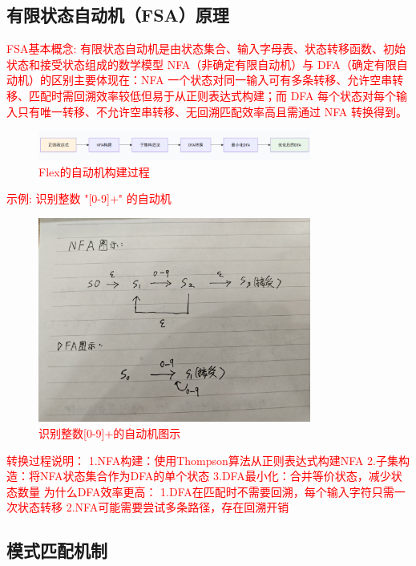 \documentclass[twocolumn]{article}
\begin{document}
\subsection{有限状态自动机（FSA）原理}

\textcolor{red}{%
FSA基本概念: 有限状态自动机是由状态集合、输入字母表、状态转移函数、初始状态和接受状态组成的数学模型
NFA（非确定有限自动机）与 DFA（确定有限自动机）的区别主要体现在：NFA 一个状态对同一输入可有多条转移、允许空串转移、匹配时需回溯效率较低但易于从正则表达式构建；而 DFA 每个状态对每个输入只有唯一转移、不允许空串转移、无回溯匹配效率高且需通过 NFA 转换得到。

\begin{figure}[htbp]
    \centering
    \includegraphics[width=0.8\textwidth]{Flex_auto_create.png}
    \caption{Flex的自动机构建过程}
    \label{fig:flex_workflow}
\end{figure}

示例: 识别整数 "[0-9]+" 的自动机

\begin{figure}[htbp]
    \centering
    \includegraphics[width=0.8\textwidth]{example1.jpg}
    \caption{识别整数[0-9]+的自动机图示}
    \label{fig:flex_workflow}
\end{figure}
转换过程说明：
1.NFA构建：使用Thompson算法从正则表达式构建NFA
2.子集构造：将NFA状态集合作为DFA的单个状态
3.DFA最小化：合并等价状态，减少状态数量
为什么DFA效率更高：
1.DFA在匹配时不需要回溯，每个输入字符只需一次状态转移
2.NFA可能需要尝试多条路径，存在回溯开销
}

\subsection{模式匹配机制}
\end{document}
